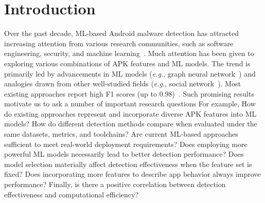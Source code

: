 \section{Introduction}
\label{sec:intro}


Over the past decade, ML-based Android malware detection has attracted increasing attention from various research communities, such as software engineering, security, and machine learning~\cite{qiu2020survey,liu2022deep,wu2019malscan,wu2021homdroid,mclaughlin2017deep,he2022msdroid,xu2018deeprefiner,aafer2013droidapiminer,arp2014drebin}.
Much attention has been given to exploring various combinations of APK features and ML models.
The trend is primarily led by advancements in ML models (\textit{e.g.}, graph neural network~\cite{he2022msdroid}) and analogies drawn from other well-studied fields (\textit{e.g.}, social network~\cite{wu2019malscan}).
Most existing approaches report high F1 scores (up to 0.98)~\cite{wu2019malscan,kim2018multimodal}.
Such promising results motivate us to ask a number of important research questions 
For example,
How do existing approaches represent and incorporate diverse APK features into ML models? 
How do different detection methods compare when evaluated under the same datasets, metrics, and toolchains?
Are current ML-based approaches sufficient to meet real-world deployment requirements?
Does employing more powerful ML models necessarily lead to better detection performance? Does model selection materially affect detection effectiveness when the feature set is fixed?
Does incorporating more features to describe app behavior always improve performance?
Finally, is there a positive correlation between detection effectiveness and computational efficiency?


